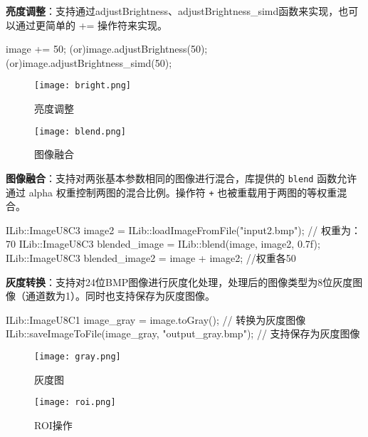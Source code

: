 \documentclass[11pt]{article}
\begin{document}
\textbf{亮度调整}：支持通过adjustBrightness、adjustBrightness\_simd函数来实现，也可以通过更简单的 += 操作符来实现。

\begin{commandline}
    image += 50;
(or)image.adjustBrightness(50); 
(or)image.adjustBrightness_simd(50);
\end{commandline}


\begin{figure}[H]
  \centering
  \begin{minipage}[b]{0.49\textwidth}
    \centering
    \texttt{[image: bright.png]}
   \caption{亮度调整}
    \label{fig:example}
  \end{minipage}
  \hfill %
  \begin{minipage}[b]{0.49\textwidth}
    \centering
    \texttt{[image: blend.png]}
  \caption{图像融合}
    \label{fig:example}
  \end{minipage}
\end{figure}

\textbf{图像融合}：支持对两张基本参数相同的图像进行混合，库提供的 \texttt{blend} 函数允许通过 alpha 权重控制两图的混合比例。操作符 \texttt{+} 也被重载用于两图的等权重混合。
\begin{commandline}
    ILib::ImageU8C3 image2 = ILib::loadImageFromFile("input2.bmp");
    // 权重为：70%
    ILib::ImageU8C3 blended_image = ILib::blend(image, image2, 0.7f);
    ILib::ImageU8C3 blended_image2 = image + image2; //权重各50%
\end{commandline}



\textbf{灰度转换}：支持对24位BMP图像进行灰度化处理，处理后的图像类型为8位灰度图像（通道数为1）。同时也支持保存为灰度图像。
\begin{commandline}
    ILib::ImageU8C1 image_gray = image.toGray(); // 转换为灰度图像
    ILib::saveImageToFile(image_gray, "output_gray.bmp"); // 支持保存为灰度图像
\end{commandline}

\begin{figure}[H]
  \centering
  \begin{minipage}[b]{0.49\textwidth}
    \centering
    \texttt{[image: gray.png]}
   \caption{灰度图}
    \label{fig:example}
  \end{minipage}
  \hfill %
  \begin{minipage}[b]{0.49\textwidth}
    \centering
    \texttt{[image: roi.png]}
  \caption{ROI操作}
    \label{fig:example}
  \end{minipage}
\end{figure}
\end{document}

